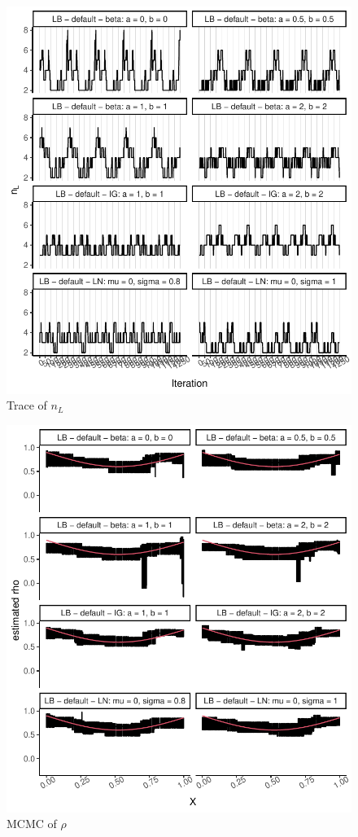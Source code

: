 \documentclass{amsart}
\begin{document}
\begin{figure}[ht]
	\centering
	\includegraphics[width=0.95\linewidth]{trace_nl_4.pdf}
	\caption{Trace of $n_L$}
	\label{fig:trace:nl:4}
\end{figure}
\iffalse
\begin{figure}[ht]
	\centering
	\includegraphics[width=0.95\linewidth]{mcmc_rho_4.pdf}
	\caption{MCMC of $\rho$}
	\label{fig:mcmc:rho:4}
\end{figure}
\end{document}
